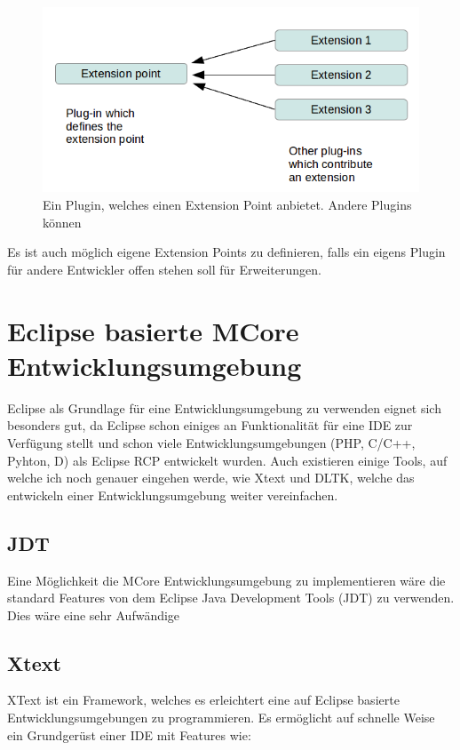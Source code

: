 \begin{figure}[H]
	\centering
		\includegraphics[scale=0.5]{platform/extensionpoint.png}
		\caption{Ein Plugin, welches einen Extension Point anbietet. Andere Plugins können}
		\label{fig:extensionpoint}
\end{figure}

Es ist auch möglich eigene Extension Points zu definieren, falls ein eigens Plugin für andere Entwickler offen stehen soll für Erweiterungen.

\section{Eclipse basierte MCore Entwicklungsumgebung}

Eclipse als Grundlage für eine Entwicklungsumgebung zu verwenden eignet sich besonders gut, da Eclipse schon einiges an Funktionalität für eine IDE zur Verfügung stellt und schon viele Entwicklungsumgebungen (PHP, C/C++, Pyhton, D) als Eclipse RCP entwickelt wurden. Auch existieren einige Tools, auf welche ich noch genauer eingehen werde, wie Xtext und DLTK, welche das entwickeln einer Entwicklungsumgebung weiter vereinfachen.

\subsection{JDT}
Eine Möglichkeit die MCore Entwicklungsumgebung zu implementieren wäre die standard Features von dem Eclipse Java Development Tools (JDT) zu verwenden. Dies wäre eine sehr Aufwändige 

\subsection{Xtext}
XText ist ein Framework, welches es erleichtert eine auf Eclipse basierte Entwicklungsumgebungen zu programmieren. Es ermöglicht auf schnelle Weise ein Grundgerüst einer IDE mit Features wie:

